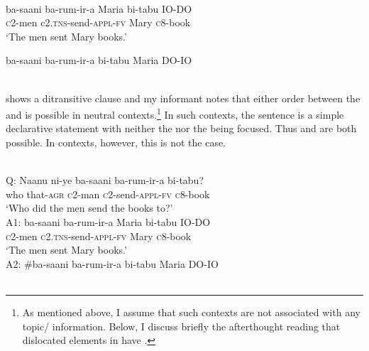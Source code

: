 \documentclass[output=paper
,newtxmath
,modfonts
,nonflat]{langsci/langscibook}
\begin{document}
\pagebreak

\ea\label{ex:selvanathan:5}
\\
\ea\label{ex:selvanathan:5a}
\gll ba-saani   ba-rum-ir-a        Maria   bi-tabu   IO-DO \\
	\textsc{c}2-men   c2.\textsc{tns}{}-send-\textsc{appl}{}-\textsc{fv}   Mary   \textsc{c}8-book \\
\glt `The men sent Mary books.'

\ex\label{ex:selvanathan:5b}
	\gll ba-saani   ba-rum-ir-a    bi-tabu   Maria     DO-IO \\
	\\
\z
\z

 shows a ditransitive clause and my informant notes that either order between the  and  is possible in neutral contexts.\footnote{As mentioned above, I assume that such contexts are not associated with any topic\slash{} information. Below, I discuss briefly the afterthought reading that dislocated elements in  have \citep{Diercks2013}.}  In such contexts, the sentence is a simple declarative statement with neither the  nor the  being focused. Thus  and  are both possible. In  contexts, however, this is not the case.

\ea\label{ex:selvanathan:6}
 \\
Q: \gll Naanu      ni-ye            ba-saani    ba-rum-ir-a     bi-tabu?\\
who       that-\textsc{agr}   \textsc{c}2-man      \textsc{c}2-send-\textsc{appl}{}-\textsc{fv}  \textsc{c}8-book\\
\glt \-\hspace{0.5cm}`Who did the men send the books to?' \\

A1: \gll ba-saani    ba-rum-ir-a            Maria  bi-tabu       IO-DO \\
	\textsc{c}2-men     \textsc{c}2.\textsc{tns}{}-send-\textsc{appl}{}-\textsc{fv}   Mary   \textsc{c}8-book \\

\glt \-\hspace{0.5cm}`The men sent Mary books.'\\

A2: \gll \#ba-saani  ba-rum-ir-a            bi-tabu   Maria         DO-IO \\
\\
\z
\end{document}
